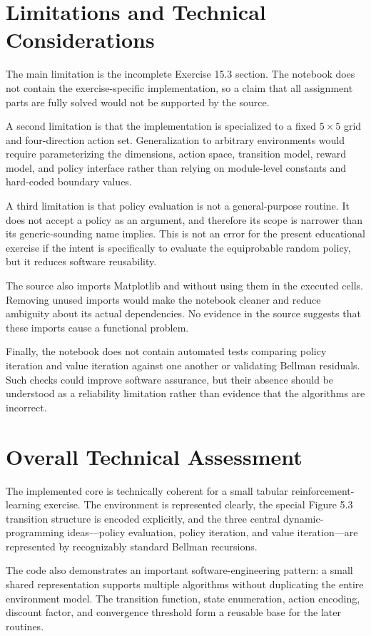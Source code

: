 \documentclass[11pt,a4paper]{article}
\newcommand{\code}[1]{\texttt{\detokenize{#1}}}
\begin{document}
\section{Limitations and Technical Considerations}
The main limitation is the incomplete Exercise 15.3 section. The notebook does not contain the exercise-specific implementation, so a claim that all assignment parts are fully solved would not be supported by the source.

A second limitation is that the implementation is specialized to a fixed \(5\times5\) grid and four-direction action set. Generalization to arbitrary environments would require parameterizing the dimensions, action space, transition model, reward model, and policy interface rather than relying on module-level constants and hard-coded boundary values.

A third limitation is that policy evaluation is not a general-purpose routine. It does not accept a policy as an argument, and therefore its scope is narrower than its generic-sounding name implies. This is not an error for the present educational exercise if the intent is specifically to evaluate the equiprobable random policy, but it reduces software reusability.

The source also imports Matplotlib and \code{time} without using them in the executed cells. Removing unused imports would make the notebook cleaner and reduce ambiguity about its actual dependencies. No evidence in the source suggests that these imports cause a functional problem.

Finally, the notebook does not contain automated tests comparing policy iteration and value iteration against one another or validating Bellman residuals. Such checks could improve software assurance, but their absence should be understood as a reliability limitation rather than evidence that the algorithms are incorrect.

\section{Overall Technical Assessment}
The implemented core is technically coherent for a small tabular reinforcement-learning exercise. The environment is represented clearly, the special Figure 5.3 transition structure is encoded explicitly, and the three central dynamic-programming ideas---policy evaluation, policy iteration, and value iteration---are represented by recognizably standard Bellman recursions.

The code also demonstrates an important software-engineering pattern: a small shared representation supports multiple algorithms without duplicating the entire environment model. The transition function, state enumeration, action encoding, discount factor, and convergence threshold form a reusable base for the later routines.
\end{document}
